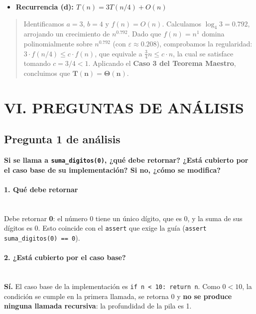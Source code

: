 \documentclass[12pt,a4paper]{article}
\begin{document}
\begin{itemize}[leftmargin=*]
    \item \textbf{Recurrencia (d): $T(n) = 3T(n/4) + O(n)$}
\end{itemize}

\begin{quote}
Identificamos $a = 3$, $b = 4$ y $f(n) = O(n)$. Calculamos $\log_4 3 = 0.792$, arrojando un
crecimiento de $n^{0.792}$. Dado que $f(n) = n^1$ domina polinomialmente sobre $n^{0.792}$
(con $\varepsilon \approx 0.208$), comprobamos la regularidad: $3 \cdot f(n/4) \leq c \cdot f(n)$,
que equivale a $\frac{3}{4}n \leq c \cdot n$, la cual se satisface tomando $c = 3/4 < 1$.
Aplicando el \textbf{Caso 3 del Teorema Maestro}, concluimos que
$\mathbf{T(n) = \Theta(n)}$.
\end{quote}

\newpage
\section*{VI. PREGUNTAS DE ANÁLISIS}

\subsection*{Pregunta 1 de análisis}

\textbf{Si se llama a \texttt{suma\_digitos(0)}, ¿qué debe retornar? ¿Está cubierto por el
caso base de su implementación? Si no, ¿cómo se modifica?}

\paragraph{1. Qué debe retornar}\mbox{}\\[4pt]
Debe retornar \textbf{0}: el número 0 tiene un único dígito, que es 0, y la suma de sus
dígitos es 0. Esto coincide con el \texttt{assert} que exige la guía
(\texttt{assert suma\_digitos(0) == 0}).

\paragraph{2. ¿Está cubierto por el caso base?}\mbox{}\\[4pt]
\textbf{Sí.} El caso base de la implementación es \texttt{if n < 10: return n}. Como
$0 < 10$, la condición se cumple en la primera llamada, se retorna 0 y \textbf{no se produce
ninguna llamada recursiva}: la profundidad de la pila es 1.
\end{document}
